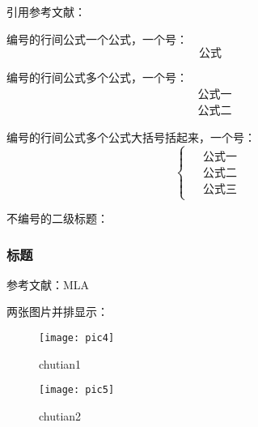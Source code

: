 引用参考文献：
\cite{第几条}

编号的行间公式一个公式，一个号：
\begin{equation}
	公式
\end{equation}

编号的行间公式多个公式，一个号：
\begin{equation}
	\begin{aligned}
		& 公式一 \\
		& 公式二
	\end{aligned}
\end{equation}

编号的行间公式多个公式大括号括起来，一个号：
\begin{equation}
	\begin{cases}
		\begin{aligned}
			& 公式一 \\
			& 公式二  \\
			& 公式三
		\end{aligned}
	\end{cases}
\end{equation}

不编号的二级标题：
\subsubsection*{标题}

参考文献：MLA
\clearpage   %
\begin{thebibliography}{99}
\end{thebibliography}

两张图片并排显示：
\usepackage{caption}
\usepackage{graphicx}
\usepackage{float} 
\usepackage{subcaption}
\begin{figure}[htbp]
	\centering
	\begin{minipage}{0.49\linewidth}
		\centering
		\texttt{[image: pic4]}
		\caption{chutian1}
		\label{chutian1}%
	\end{minipage}
	\begin{minipage}{0.49\linewidth}
		\centering
		\texttt{[image: pic5]}
		\caption{chutian2}
		\label{chutian2}%
	\end{minipage}
\end{figure}
